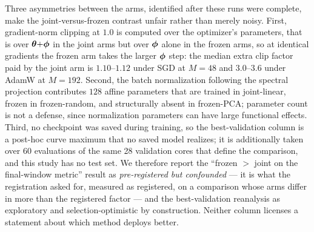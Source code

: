 Three asymmetries between the arms, identified after these runs were
complete, make the joint-versus-frozen contrast unfair rather than
merely noisy. First, gradient-norm clipping at $1.0$ is computed over
the optimizer's parameters, that is over ${\boldsymbol{\theta}}{+}{\boldsymbol{\phi}}$ in the
joint arms but over ${\boldsymbol{\phi}}$ alone in the frozen arms, so at identical
gradients the frozen arm takes the larger ${\boldsymbol{\phi}}$ step: the median
extra clip factor paid by the joint arm is $1.10$--$1.12$ under SGD at
$M{=}48$ and $3.0$--$3.6$ under AdamW at $M{=}192$. Second, the batch
normalization following the spectral projection contributes $128$
affine parameters that are trained in joint-linear, frozen in
frozen-random, and structurally absent in frozen-PCA; parameter count
is not a defense, since normalization parameters can have large
functional effects. Third, no checkpoint was saved during training, so
the best-validation column is a post-hoc curve maximum that no saved
model realizes; it is additionally taken over 60 evaluations of the
same 28 validation cores that define the comparison, and this study
has no test set. We therefore report the ``frozen $>$ joint on the
final-window metric'' result as \emph{pre-registered but confounded}
--- it is what the registration asked for, measured as registered, on
a comparison whose arms differ in more than the registered factor ---
and the best-validation reanalysis as exploratory and
selection-optimistic by construction. Neither column licenses a
statement about which method deploys better.

